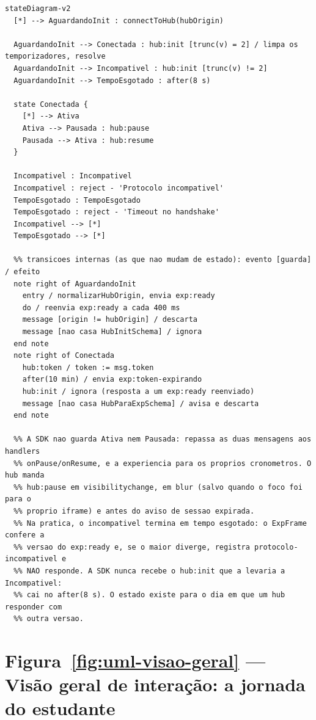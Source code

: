 \begin{lstlisting}[language=mermaid]
stateDiagram-v2
  [*] --> AguardandoInit : connectToHub(hubOrigin)

  AguardandoInit --> Conectada : hub:init [trunc(v) = 2] / limpa os temporizadores, resolve
  AguardandoInit --> Incompativel : hub:init [trunc(v) != 2]
  AguardandoInit --> TempoEsgotado : after(8 s)

  state Conectada {
    [*] --> Ativa
    Ativa --> Pausada : hub:pause
    Pausada --> Ativa : hub:resume
  }

  Incompativel : Incompativel
  Incompativel : reject - 'Protocolo incompativel'
  TempoEsgotado : TempoEsgotado
  TempoEsgotado : reject - 'Timeout no handshake'
  Incompativel --> [*]
  TempoEsgotado --> [*]

  %% transicoes internas (as que nao mudam de estado): evento [guarda] / efeito
  note right of AguardandoInit
    entry / normalizarHubOrigin, envia exp:ready
    do / reenvia exp:ready a cada 400 ms
    message [origin != hubOrigin] / descarta
    message [nao casa HubInitSchema] / ignora
  end note
  note right of Conectada
    hub:token / token := msg.token
    after(10 min) / envia exp:token-expirando
    hub:init / ignora (resposta a um exp:ready reenviado)
    message [nao casa HubParaExpSchema] / avisa e descarta
  end note

  %% A SDK nao guarda Ativa nem Pausada: repassa as duas mensagens aos handlers
  %% onPause/onResume, e a experiencia para os proprios cronometros. O hub manda
  %% hub:pause em visibilitychange, em blur (salvo quando o foco foi para o
  %% proprio iframe) e antes do aviso de sessao expirada.
  %% Na pratica, o incompativel termina em tempo esgotado: o ExpFrame confere a
  %% versao do exp:ready e, se o maior diverge, registra protocolo-incompativel e
  %% NAO responde. A SDK nunca recebe o hub:init que a levaria a Incompativel:
  %% cai no after(8 s). O estado existe para o dia em que um hub responder com
  %% outra versao.
\end{lstlisting}

\section{Figura~\ref{fig:uml-visao-geral} --- Visão geral de interação: a jornada do estudante}

